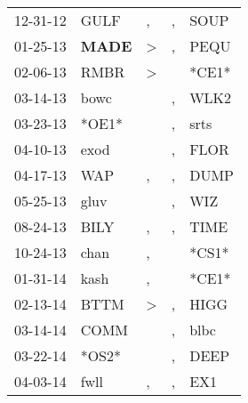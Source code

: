 \begin{supertabular}{p{0.07\textwidth}p{0.06\textwidth}p{0.02\textwidth}p{0.02\textwidth}p{0.06\textwidth}}
          12-31-12\textsuperscript{} &           GULF\textsuperscript{} &                , &             , &           SOUP\textsuperscript{} \\
          01-25-13\textsuperscript{} &  \textbf{MADE\textsuperscript{}} &     \textgreater &             , &           PEQU\textsuperscript{} \\
          02-06-13\textsuperscript{} &           RMBR\textsuperscript{} &     \textgreater &               &                            *CE1* \\
          03-14-13\textsuperscript{} &           bowc\textsuperscript{} &                  &             , &           WLK2\textsuperscript{} \\
          03-23-13\textsuperscript{} &                            *OE1* &                  &             , &           srts\textsuperscript{} \\
          04-10-13\textsuperscript{} &           exod\textsuperscript{} &                  &             , &           FLOR\textsuperscript{} \\
          04-17-13\textsuperscript{} &            WAP\textsuperscript{} &                , &             , &           DUMP\textsuperscript{} \\
          05-25-13\textsuperscript{} &           gluv\textsuperscript{} &                  &             , &            WIZ\textsuperscript{} \\
          08-24-13\textsuperscript{} &           BILY\textsuperscript{} &                , &             , &           TIME\textsuperscript{} \\
          10-24-13\textsuperscript{} &           chan\textsuperscript{} &                , &               &                            *CS1* \\
          01-31-14\textsuperscript{} &           kash\textsuperscript{} &                , &               &                            *CE1* \\
          02-13-14\textsuperscript{} &           BTTM\textsuperscript{} &     \textgreater &             , &           HIGG\textsuperscript{} \\
          03-14-14\textsuperscript{} &           COMM\textsuperscript{} &                  &             , &           blbc\textsuperscript{} \\
          03-22-14\textsuperscript{} &                            *OS2* &                  &             , &           DEEP\textsuperscript{} \\
          04-03-14\textsuperscript{} &           fwll\textsuperscript{} &                , &             , &            EX1\textsuperscript{} \\

\end{supertabular}
